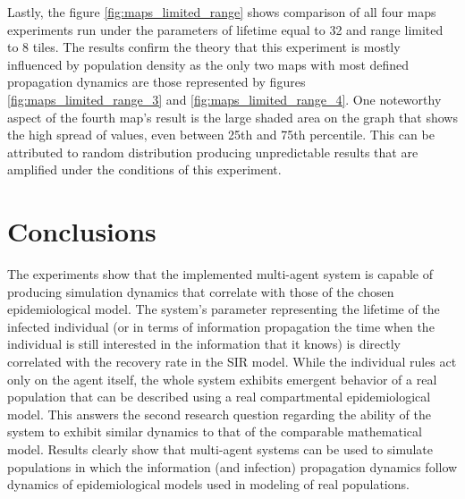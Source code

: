 Lastly, the figure \ref{fig:maps_limited_range} shows comparison of all four maps experiments run under the parameters of lifetime equal to 32 and range limited to 8 tiles.
The results confirm the theory that this experiment is mostly influenced by population density as the only two maps with most defined propagation dynamics are those represented by figures \ref{fig:maps_limited_range_3} and \ref{fig:maps_limited_range_4}.
One noteworthy aspect of the fourth map's result is the large shaded area on the graph that shows the high spread of values, even between 25th and 75th percentile.
This can be attributed to random distribution producing unpredictable results that are amplified under the conditions of this experiment.

\section{Conclusions}

The experiments show that the implemented multi-agent system is capable of producing simulation dynamics that correlate with those of the chosen epidemiological model.
The system's parameter representing the lifetime of the infected individual (or in terms of information propagation the time when the individual is still interested in the information that it knows) is directly correlated with the recovery rate in the SIR model.
While the individual rules act only on the agent itself, the whole system exhibits emergent behavior of a real population that can be described using a real compartmental epidemiological model.
This answers the second research question regarding the ability of the system to exhibit similar dynamics to that of the comparable mathematical model.
Results clearly show that multi-agent systems can be used to simulate populations in which the information (and infection) propagation dynamics follow dynamics of epidemiological models used in modeling of real populations.